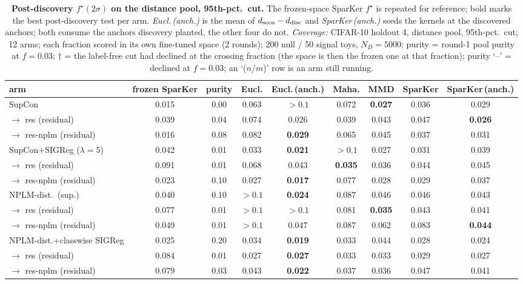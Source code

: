 \begin{table}[t]
\centering
\footnotesize
\begin{tabular}{lcccccccc}
\toprule
arm & frozen SparKer & purity & Eucl. & Eucl.\,(anch.) & Maha. & MMD & SparKer & SparKer\,(anch.) \\
\midrule
SupCon & 0.015 & 0.00 & 0.063 & $>0.1$ & 0.072 & \textbf{0.027} & 0.036 & 0.029 \\
\quad $\to$ res (residual) & 0.039 & 0.04 & 0.074 & 0.026 & 0.039 & 0.043 & 0.047 & \textbf{0.026} \\
\quad $\to$ res-nplm (residual) & 0.016 & 0.08 & 0.082 & \textbf{0.029} & 0.065 & 0.045 & 0.037 & 0.031 \\
\addlinespace
SupCon+SIGReg ($\lambda{=}5$) & 0.042 & 0.01 & 0.033 & \textbf{0.021} & $>0.1$ & 0.027 & 0.031 & 0.039 \\
\quad $\to$ res (residual) & 0.091 & 0.01 & 0.068 & 0.043 & \textbf{0.035} & 0.036 & 0.044 & 0.045 \\
\quad $\to$ res-nplm (residual) & 0.023 & 0.10 & 0.027 & \textbf{0.017} & 0.077 & 0.028 & 0.029 & 0.037 \\
\addlinespace
NPLM-dist.\ (sup.) & 0.040 & 0.10 & $>0.1$ & \textbf{0.024} & 0.087 & 0.046 & 0.046 & 0.043 \\
\quad $\to$ res (residual) & 0.077 & 0.01 & $>0.1$ & $>0.1$ & 0.081 & \textbf{0.035} & 0.043 & 0.041 \\
\quad $\to$ res-nplm (residual) & 0.049 & 0.01 & $>0.1$ & 0.047 & 0.087 & 0.062 & 0.083 & \textbf{0.044} \\
\addlinespace
NPLM-dist.+classwise SIGReg & 0.025 & 0.20 & 0.034 & \textbf{0.019} & 0.033 & 0.044 & 0.028 & 0.024 \\
\quad $\to$ res (residual) & 0.084 & 0.01 & 0.027 & \textbf{0.027} & 0.033 & 0.033 & 0.029 & 0.027 \\
\quad $\to$ res-nplm (residual) & 0.079 & 0.03 & 0.043 & \textbf{0.022} & 0.037 & 0.036 & 0.047 & 0.041 \\
\bottomrule
\end{tabular}
\caption{\textbf{Post-discovery $f^\star(2\sigma)$ on the distance pool, 95th-pct.\ cut.} The frozen-space SparKer $f^\star$ is repeated for reference; bold marks the best post-discovery test per arm. \emph{Eucl.\,(anch.)} is the mean of $d_{\rm seen}-d_{\rm disc}$ and \emph{SparKer\,(anch.)} seeds the kernels at the discovered anchors; both consume the anchors discovery planted, the other four do not. \emph{Coverage:} CIFAR-10 holdout 4, distance pool, 95th-pct.\ cut; 12 arms; each fraction scored in its own fine-tuned space (2 rounds); 200 null / 50 signal toys, $N_D{=}5000$; purity = round-1 pool purity at $f{=}0.03$; $\dagger$ = the label-free cut had declined at the crossing fraction (the space is then the frozen one at that fraction); purity `--' = declined at $f{=}0.03$; an `($n$/$m$)' row is an arm still running.}
\label{tab:sigma_post_cifar10_h4_quantile}
\end{table}
